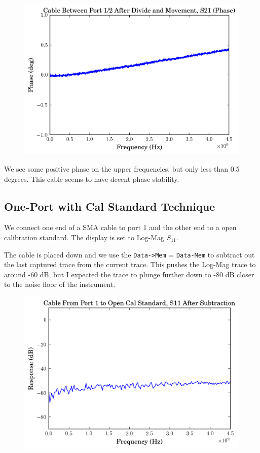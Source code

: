 \documentclass[11pt]{article}
\begin{document}
\begin{figure}[H]
	\centering \includegraphics[width=\linewidth-7cm]{images/cable_phase_s21_after_movement.png}
\end{figure}

We see some positive phase on the upper frequencies, but only less than 0.5 degrees. This cable seems to have decent phase stability.

\subsection{One-Port with Cal Standard Technique}

We connect one end of a SMA cable to port 1 and the other end to a open calibration standard. The display is set to Log-Mag $S_{11}$.

The cable is placed down and we use the \verb|Data->Mem| = \verb|Data-Mem| to subtract out the last captured trace from the current trace. This pushes the Log-Mag trace to around -60 dB, but I expected the trace to plunge further down to -80 dB closer to the noise floor of the instrument.

\begin{figure}[H]
	\centering \includegraphics[width=\linewidth-6cm]{images/one_port_s11_open_cal.png}
\end{figure}
\end{document}

